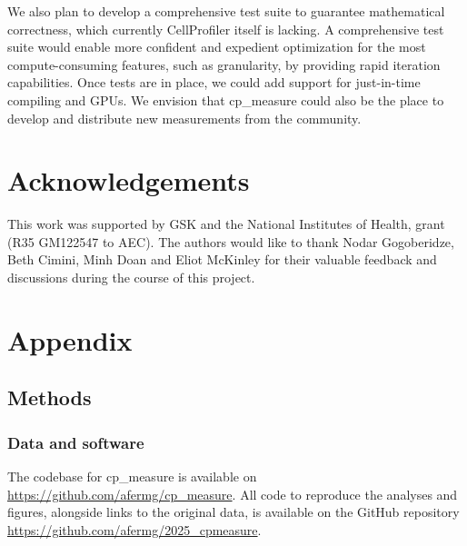 \documentclass{article}
\begin{document}
We also plan to develop a comprehensive test suite to guarantee mathematical correctness, which currently CellProfiler itself is lacking. A comprehensive test suite would enable more confident and expedient optimization for the most compute-consuming features, such as granularity, by providing rapid iteration capabilities. Once tests are in place, we could add support for just-in-time compiling and GPUs. We envision that cp\_measure could also be the place to develop and distribute new measurements from the community. 




\onecolumn
\section{Acknowledgements}
\label{sec:acknowledgements}

This work was supported by GSK and the National Institutes of Health, grant (R35 GM122547 to AEC). The authors would like to thank Nodar Gogoberidze, Beth Cimini, Minh Doan and Eliot McKinley for their valuable feedback and discussions during the course of this project.

\section{Appendix}

\appendix
\setcounter{figure}{0}
\renewcommand{\thefigure}{A\arabic{figure}}

\setcounter{section}{5}
\renewcommand{\thesection}{\arabic{section}}
\renewcommand{\thesubsection}{\thesection.\arabic{subsection}}
\renewcommand{\thesubsubsection}{\thesubsection.\arabic{subsubsection}}


\label{sec:orgdd18dd8}
\subsection{Methods}
\label{sec:orgb3e9382}
\subsubsection{Data and software}
\label{sec:orgbda0ae2}
The codebase for cp\_measure is available on \url{https://github.com/afermg/cp_measure}. All code to reproduce the analyses and figures, alongside links to the original data, is available on the GitHub repository \url{https://github.com/afermg/2025_cpmeasure}. 
% 
\end{document}
